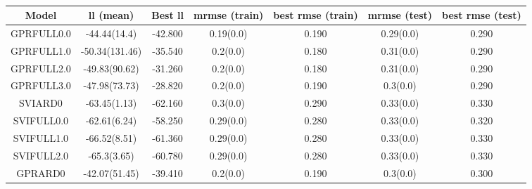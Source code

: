 \begin{table}
	\begin{center}
		\begin{tabular}{|c|c|c|c|c|c|c|}
			\hline
			Model & ll (mean) & Best ll & mrmse (train) & best rmse (train) & mrmse (test) & best rmse (test) \\
			\hline
			GPRFULL0.0 & -44.44(14.4) & -42.800 & 0.19(0.0) & 0.190 & 0.29(0.0) & 0.290 \\
			\hline
			GPRFULL1.0 & -50.34(131.46) & -35.540 & 0.2(0.0) & 0.180 & 0.31(0.0) & 0.290 \\
			\hline
			GPRFULL2.0 & -49.83(90.62) & -31.260 & 0.2(0.0) & 0.180 & 0.31(0.0) & 0.290 \\
			\hline
			GPRFULL3.0 & -47.98(73.73) & -28.820 & 0.2(0.0) & 0.190 & 0.3(0.0) & 0.290 \\
			\hline
			SVIARD0 & -63.45(1.13) & -62.160 & 0.3(0.0) & 0.290 & 0.33(0.0) & 0.330 \\
			\hline
			SVIFULL0.0 & -62.61(6.24) & -58.250 & 0.29(0.0) & 0.280 & 0.33(0.0) & 0.320 \\
			\hline
			SVIFULL1.0 & -66.52(8.51) & -61.360 & 0.29(0.0) & 0.280 & 0.33(0.0) & 0.330 \\
			\hline
			SVIFULL2.0 & -65.3(3.65) & -60.780 & 0.29(0.0) & 0.280 & 0.33(0.0) & 0.330 \\
			\hline
			GPRARD0 & -42.07(51.45) & -39.410 & 0.2(0.0) & 0.190 & 0.3(0.0) & 0.300 \\
			\hline
		\end{tabular}
	\end{center}
	\caption{}
\end{table}